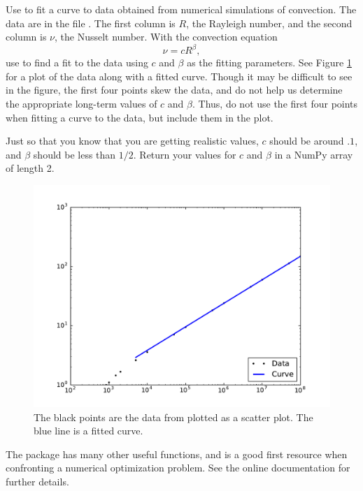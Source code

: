 \begin{problem} %
Use  to fit a curve to data obtained from numerical simulations of convection.
The data are in the file . 
The first column is $R$, the Rayleigh number, and the second column is $\nu$, the Nusselt number.
With the convection equation 
\[
\nu = cR^\beta,
\]
use  to find a fit to the data using $c$ and $\beta$ as the fitting parameters. 
See Figure \ref{opt:ConvectionFit} for a plot of the data along with a fitted curve.
Though it may be difficult to see in the figure, the first four points skew the data, and do not help us determine the appropriate long-term values of $c$ and $\beta$. 
Thus, do not use the first four points when fitting a curve to the data, but include them in the plot.

Just so that you know that you are getting realistic values, $c$ should be around $.1$, and $\beta$ should be less than $1/2$.
Return your values for $c$ and $\beta$ in a NumPy array of length 2.
\end{problem}

\begin{figure}
\includegraphics[width=\textwidth]{ConvectionFit.pdf}
\caption{The black points are the data from  plotted as a scatter plot. The blue line is a fitted curve.}
\label{opt:ConvectionFit}
\end{figure}

The  package has many other useful functions, and is a good first resource when confronting a numerical optimization problem. 
See the online documentation for further details.
